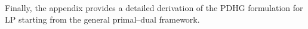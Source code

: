 \documentclass[twoside,12pt,openright]{report}  %
\begin{document}
Finally, the appendix provides a detailed derivation of the PDHG formulation for LP starting from the general primal–dual framework.


 




\end{document}
